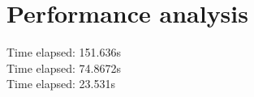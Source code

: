\section{Performance analysis}
Time elapsed: 151.636s\\
Time elapsed: 74.8672s\\
Time elapsed: 23.531s\\